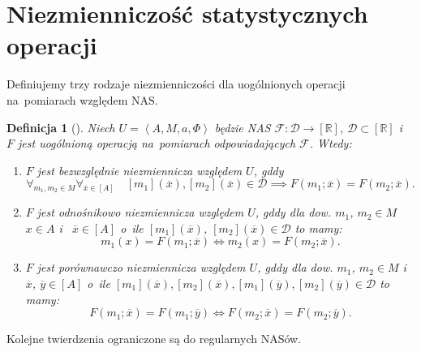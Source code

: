 \documentclass[12pt,a4paper]{report}
\newtheorem{definition}{Definicja}[chapter]
\newcommand{\domkniecie}[1]{\left[ {#1} \right] }
\newcommand{\tuple}[1]{\left\langle {#1} \right\rangle}
\begin{document}
\section{Niezmienniczość statystycznych operacji}
Definiujemy trzy rodzaje niezmienniczości dla uogólnionych operacji na~pomiarach względem NAS. 
\begin{definition}[{\citep[Def. 5]{adams1965theory}}]
Niech $U=\tuple{A,M,a,\Phi}$ będzie NAS $\mathcal{F}:\mathcal{D}\to\domkniecie{\mathbb{R}}$, $\mathcal{D}\subset \domkniecie{\mathbb{R}}$ i~$F$ jest uogólnioną operacją na~pomiarach odpowiadających $\mathcal{F}$. Wtedy:
\begin{enumerate}
\item
$F$ jest bezwzględnie niezmiennicza względem $U$, gddy
$$
\forall_{m_{1}, m_{2} \in M}  \forall_{\overline{x} \in \domkniecie{A}} \quad \domkniecie{m_1}(\overline{x}), \domkniecie{m_2}(\overline{x})\in \mathcal{D} \implies F(m_{1};\overline{x})=F(m_{2};\overline{x}).
$$
\item
$F$ jest odnośnikowo niezmiennicza względem $U$, gddy dla dow. $m_{1}$, $m_{2} \in M$ $x \in A$ i~ $\overline{x} \in \domkniecie{A}$ o~ile  $\domkniecie{m_1}(\overline{x})$, $\domkniecie{m_2}(\overline{x})\in \mathcal{D}$ to mamy:
$$
 m_{1}(x)=F(m_{1};\overline{x}) \iff m_{2}(x)=F(m_{2};\overline{x}).
$$
\item
$F$ jest porównawczo niezmiennicza względem $U$, gddy dla dow. $m_1$, $m_2 \in M$ i~$\overline{x}$, $\overline{y} \in \domkniecie{A}$ o~ile $\domkniecie{m_1}(\overline{x}), \domkniecie{ m_2}(\overline{x}), \domkniecie{m_1}(\overline{y}), \domkniecie{m_2}(\overline{y}) \in \mathcal{D}$ to mamy:
$$
F(m_{1};\overline{x})=F(m_{1};\overline{y}) \iff F(m_{2};\overline{x})=F(m_{2};\overline{y}).
$$
\end{enumerate} 
\end{definition}

Kolejne twierdzenia ograniczone są do regularnych NASów.
\end{document}
